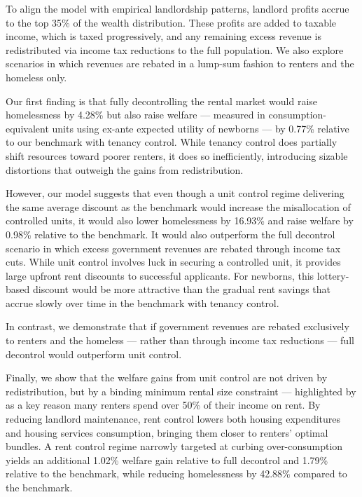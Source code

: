 \documentclass[parskip=full]{article}
\begin{document}
To align the model with empirical landlordship patterns, landlord profits accrue to the top 35\% of the wealth distribution. These profits are added to taxable income, which is taxed progressively, and any remaining excess revenue is redistributed via income tax reductions to the full population. We also explore scenarios in which revenues are rebated in a lump-sum fashion to renters and the homeless only.

Our first finding is that fully decontrolling the rental market would raise homelessness by 4.28\% but also raise welfare — measured in consumption-equivalent units using ex-ante expected utility of newborns — by 0.77\% relative to our benchmark with tenancy control. While tenancy control does partially shift resources toward poorer renters, it does so inefficiently, introducing sizable distortions that outweigh the gains from redistribution.

However, our model suggests that even though a unit control regime delivering the same average discount as the benchmark would increase the misallocation of controlled units, it would also lower homelessness by 16.93\% and raise welfare by 0.98\% relative to the benchmark. It would also outperform the full decontrol scenario in which excess government revenues are rebated through income tax cuts. While unit control involves luck in securing a controlled unit, it provides large upfront rent discounts to successful applicants. For newborns, this lottery-based discount would be more attractive than the gradual rent savings that accrue slowly over time in the benchmark with tenancy control.

In contrast, we demonstrate that if government revenues are rebated exclusively to renters and the homeless — rather than through income tax reductions — full decontrol would outperform unit control. 

Finally, we show that the welfare gains from unit control are not driven by redistribution, but by a binding minimum rental size constraint — highlighted by \citet{rs-2023} as a key reason many renters spend over 50\% of their income on rent. By reducing landlord maintenance, rent control lowers both housing expenditures and housing services consumption, bringing them closer to renters’ optimal bundles. A rent control regime narrowly targeted at curbing over-consumption yields an additional 1.02\% welfare gain relative to full decontrol and 1.79\% relative to the benchmark, while reducing homelessness by 42.88\% compared to the benchmark.
\end{document}
